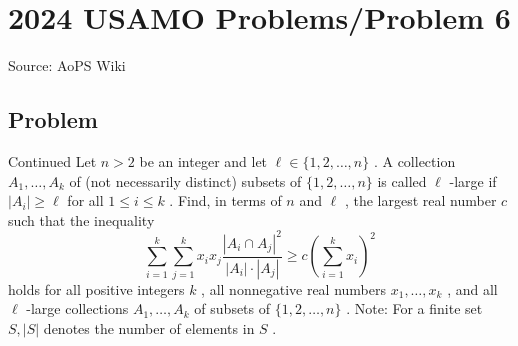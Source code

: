 \documentclass[12pt]{article}
\begin{document}
\section*{{2024 USAMO Problems/Problem 6}}
Source: AoPS Wiki

\subsection*{Problem}
Continued Let $n>2$ be an integer and let $\ell \in\{1,2, \ldots, n\}$ . A collection $A_1, \ldots, A_k$ of (not necessarily distinct) subsets of $\{1,2, \ldots, n\}$ is called $\ell$ -large if $\left|A_i\right| \geq \ell$ for all $1 \leq i \leq k$ . Find, in terms of $n$ and $\ell$ , the largest real number $c$ such that the inequality \[\sum_{i=1}^k \sum_{j=1}^k x_i x_j \frac{\left|A_i \cap A_j\right|^2}{\left|A_i\right| \cdot\left|A_j\right|} \geq c\left(\sum_{i=1}^k x_i\right)^2\] holds for all positive integers $k$ , all nonnegative real numbers $x_1, \ldots, x_k$ , and all $\ell$ -large collections $A_1, \ldots, A_k$ of subsets of $\{1,2, \ldots, n\}$ .
Note: For a finite set $S,|S|$ denotes the number of elements in $S$ .
\end{document}
